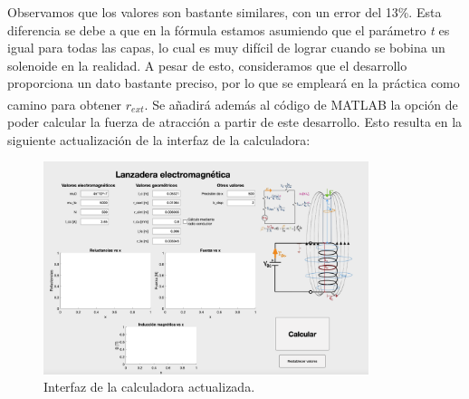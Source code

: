 Observamos que los valores son bastante similares, con un error del 13\%. Esta diferencia se debe a que en la fórmula estamos asumiendo que el parámetro \textit{t} es igual para todas las capas, lo cual es muy difícil de lograr cuando se bobina un solenoide en la realidad. A pesar de esto, consideramos que el desarrollo proporciona un dato bastante preciso, por lo que se empleará en la práctica como camino para obtener \(r_{ext}\). Se añadirá además al código de MATLAB\textsuperscript{\textregistered}  la opción de poder calcular la fuerza de atracción a partir de este desarrollo. Esto resulta en la siguiente actualización de la interfaz de la calculadora:

\begin{figure}[H]
    \centering
    \includegraphics[width=9.5cm]{FigurasMemoria/calculadoraDef.png}
    \caption{Interfaz de la calculadora actualizada.}
    \label{fig:calculadoraDef} %
\end{figure}